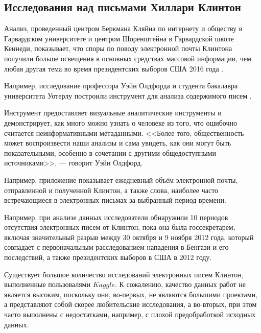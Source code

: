 \subsection{Исследования над письмами Хиллари Клинтон}


Анализ, проведенный центром Беркмана Кляйна по интернету и обществу в Гарвардском университете и центром Шоренштейна в Гарвардской школе Кеннеди, показывает, что споры по поводу электронной почты Клинтона получили больше освещения в основных средствах массовой информации, чем любая другая тема во время президентских выборов США 2016 года \cite{clinton_research_bib}.

Например, исследование профессора Уэйн Олдфорда и студента бакалавра университета Уотерлу построили инструмент для анализа содержимого писем \cite{clinton_oldford_bib}.

Инструмент предоставляет визуальные аналитические инструменты и демонстрирует, как много можно узнать о человеке из того, что ошибочно считается неинформативными метаданными. <<Более того, общественность может воспроизвести наши анализы и сама увидеть, как они могут быть показательными, особенно в сочетании с другими общедоступными источниками>>, --- говорит Уэйн Олдфорд.

Например, приложение показывает ежедневный объём электронной почты, отправленной и полученной Клинтон, а также слова, наиболее часто встречающиеся в электронных письмах за выбранный период времени.

Например, при анализе данных исследователи обнаружили 10 периодов отсутствия электронных писем от Клинтон, пока она была госсекретарем, включая значительный разрыв между 30 октября и 9 ноября 2012 года, который совпадает с первоначальным расследованием нападения в Бенгази и его последствий, а также президентских выборов в США в 2012 году.

Существует большое количество исследований электронных писем Клинтон, выполненные пользовалями $Kaggle$. К сожалению, качество данных работ не является высоким, поскольку они, во-первых, не являются большими проектами, а представляют собой скорее любительские исследования, а во-вторых, при этом часто выполнены с недостатками, например, с плохой предобработкой исходных данных. 
